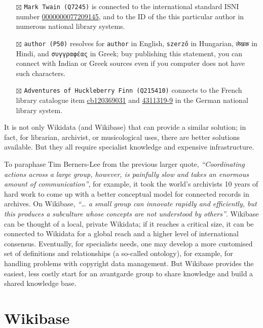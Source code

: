 \documentclass[
  letterpaper,
  DIV=11,
  numbers=noendperiod]{scrreprt}
\begin{document}
\begin{itemize}
\item[$\boxtimes$]
  \texttt{Mark\ Twain\ (Q7245)} is connected to the international
  standard ISNI number
  \href{https://isni.org/isni/0000000077209145}{0000000077209145}, and
  to the ID of the this particular author in numerous national library
  systems.
\item[$\boxtimes$]
  \texttt{author\ (P50)} resolves for \texttt{author} in English,
  \texttt{szerző} in Hungarian, \texttt{लेखक} in Hindi, and
  \texttt{συγγραφέας} in Greek; buy publishing this statement, you can
  connect with Indian or Greek sources even if you computer does not
  have such characters.
\item[$\boxtimes$]
  \texttt{Adventures\ of\ Huckleberry\ Finn\ (Q215410)} connects to the
  French library catalogue item
  \href{https://catalogue.bnf.fr/ark:/12148/cb120369031}{cb120369031}
  and \href{https://d-nb.info/gnd/4311319-9}{4311319-9} in the German
  national library system.
\end{itemize}

It is not only Wikidata (and Wikibase) that can provide a similar
solution; in fact, for librarian, archivist, or musicological uses,
there are better solutions available. But they all require specialist
knowledge and expensive infrastructure.

To paraphase Tim Berners-Lee from the previous larger quote,
\emph{``Coordinating actions across a large group, however, is painfully
slow and takes an enormous amount of communication''}, for example, it
took the world's archivists 10 years of hard work to come up with a
better conceptual model for connected records in archives. On Wikibase,
\emph{``\ldots{} a small group can innovate rapidly and efficiently, but
this produces a subculture whose concepts are not understood by
others''}. Wikibase can be thought of a local, private Wikidata; if it
reaches a critical size, it can be connected to Wikidata for a global
reach and a higher level of international consensus. Eventually, for
specialists needs, one may develop a more customised set of definitions
and relationships (a so-called ontology), for example, for handling
problems with copyright data management. But Wikibase provides the
easiest, less costly start for an avantgarde group to share knowledge
and build a shared knowledge base.

\section{Wikibase}\label{wikibase}
\end{document}
